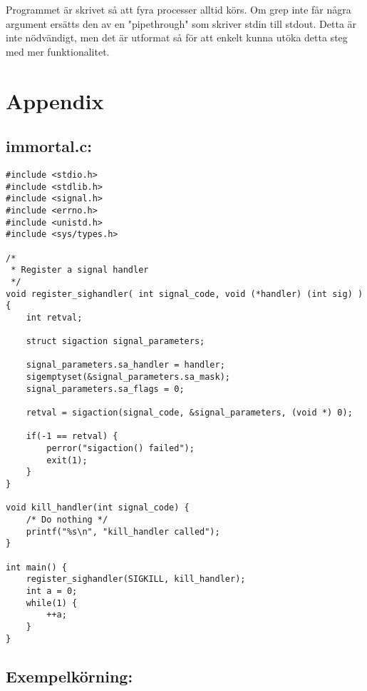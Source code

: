 \documentclass[paper=a4, fontsize=11pt]{scrartcl} %
\numberwithin{equation}{section} %
\numberwithin{figure}{section} %
\numberwithin{table}{section} %
\begin{document}
Programmet är skrivet så att fyra processer alltid körs. Om grep inte får
några argument ersätts den av en "pipethrough" som skriver stdin till stdout.
Detta är inte nödvändigt, men det är utformat så för att enkelt kunna utöka
detta steg med mer funktionalitet.


\newpage
\section*{Appendix}
\subsection*{immortal.c:}

\begin{verbatim}
#include <stdio.h>
#include <stdlib.h>
#include <signal.h>
#include <errno.h>
#include <unistd.h>
#include <sys/types.h>

/*
 * Register a signal handler
 */
void register_sighandler( int signal_code, void (*handler) (int sig) )  {
    int retval;

    struct sigaction signal_parameters;

    signal_parameters.sa_handler = handler;
    sigemptyset(&signal_parameters.sa_mask);
    signal_parameters.sa_flags = 0;

    retval = sigaction(signal_code, &signal_parameters, (void *) 0);

    if(-1 == retval) {
        perror("sigaction() failed");
        exit(1);
    }
}

void kill_handler(int signal_code) {
    /* Do nothing */
    printf("%s\n", "kill_handler called");
}

int main() {
    register_sighandler(SIGKILL, kill_handler);
    int a = 0;
    while(1) {
        ++a;
    }
}
\end{verbatim}
\newpage


\subsection*{Exempelkörning:}
\end{document}

